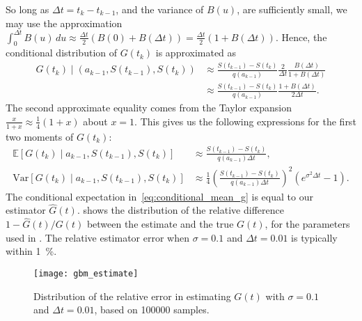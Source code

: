 \documentclass[main.tex]{subfiles}
\begin{document}
So long as $\Delta t=t_{k}-t_{k-1}$, and the variance of $B(u)$, are
sufficiently small, we may use the approximation
$\int_{0}^{\Delta{t}}B(u)\,du\approx  \frac{\Delta
  t}{2}(B(0)+B(\Delta t))=\frac{\Delta
  t}{2}(1+B(\Delta t))$.
Hence, the conditional distribution of $G(t_{k})$ is approximated as
\begin{align}
  G(t_{k})\mid (a_{k-1},S(t_{k-1}),S(t_{k}))
  &\approx
    \frac{S(t_{k-1})-S(t_{k})}{q(a_{k-1})}\frac{2}{\Delta t}\frac{B(\Delta t)}{1+B(\Delta t)}\\
  &\approx \frac{S(t_{k-1})-S(t_{k})}{q(a_{k-1})}\frac{1+B(\Delta t)}{2\Delta t}.
\end{align}
The second approximate equality comes from the Taylor
expansion $\frac{x}{1+x}\approx \frac{1}{4}(1+x)$ about $x=1$.
This gives us the following expressions for the first two moments
of $G(t_{k})$:
\begin{align}\label{eq:conditional_mean_g}
  \mathbb{E}[G(t_{k})\mid a_{k-1},S(t_{k-1}),S(t_{k})]
  &\approx \frac{S(t_{k-1})-S(t_{k})}{ q(a_{k-1})\Delta t},\\
  \mbox{Var}[G(t_{k})\mid a_{k-1},S(t_{k-1}),S(t_{k})]
  &\approx \frac{1}{4}{\left(\frac{S(t_{k-1})-S(t_{k})}{
    q(a_{k-1})\Delta t}\right)}^2\left( e^{\sigma^2\Delta t} -1 \right).
\end{align}
The conditional expectation in~\eqref{eq:conditional_mean_g} is equal
to our estimator $\hat G(t)$.
 shows the distribution of the relative
difference $1-\hat G(t)/G(t)$ between
the estimate and the true $G(t)$, for
the parameters used in . The relative
estimator error when $\sigma=0.1$ and $\Delta t=0.01$
is typically within \SI{1}{\percent}.
\begin{figure}[htbp]
  \centering
  \texttt{[image: gbm\_estimate]}
  \caption[Distribution of the relative error in estimating $G(t)$]{Distribution of the relative error in estimating $G(t)$ with
    $\sigma=0.1$ and $\Delta t= 0.01$, based on \num{100000} samples.}\label{fig:gbm_estimate}
\end{figure}
\end{document}
